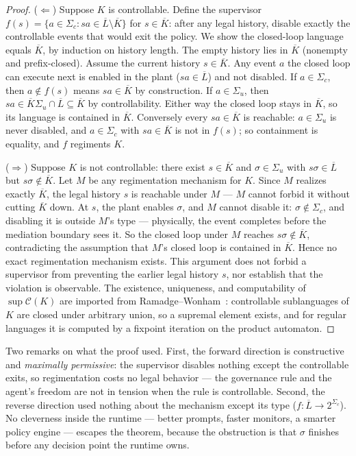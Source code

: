 \documentclass[11pt,a4paper]{article}  \usepackage{mdframed} \usepackage{graphicx} \usepackage{tabularx}
\begin{document}
\begin{proof} ($\Leftarrow$) Suppose $K$ is controllable. Define the supervisor $f(s)=\{a\in\Sigma_c :
sa\in\overline{L}\setminus\overline{K}\}$ for $s\in\overline{K}$: after any legal history, disable exactly the controllable
events that would exit the policy. We show the closed-loop language equals $\overline{K}$, by induction on history length.
The empty history lies in $\overline{K}$ (nonempty and prefix-closed). Assume the current history $s\in\overline{K}$. Any
event $a$ the closed loop can execute next is enabled in the plant ($sa\in\overline{L}$) and not disabled. If $a\in\Sigma_c$,
then $a\notin f(s)$ means $sa\in\overline{K}$ by construction. If $a\in\Sigma_u$, then
$sa\in\overline{K}\Sigma_u\cap\overline{L}\subseteq\overline{K}$ by controllability. Either way the closed loop stays in
$\overline{K}$, so its language is contained in $\overline{K}$. Conversely every $sa\in\overline{K}$ is reachable:
$a\in\Sigma_u$ is never disabled, and $a\in\Sigma_c$ with $sa\in\overline{K}$ is not in $f(s)$; so containment is equality,
and $f$ regiments $K$.

($\Rightarrow$) Suppose $K$ is not controllable: there exist $s\in\overline{K}$ and $\sigma\in\Sigma_u$ with
$s\sigma\in\overline{L}$ but $s\sigma\notin\overline{K}$. Let $M$ be any regimentation mechanism for $K$. Since $M$ realizes
exactly $\overline{K}$, the legal history $s$ is reachable under $M$ --- $M$ cannot forbid it without cutting $\overline{K}$
down. At $s$, the plant enables $\sigma$, and $M$ cannot disable it: $\sigma\notin\Sigma_c$, and disabling it is outside
$M$'s type --- physically, the event completes before the mediation boundary sees it. So the closed loop under $M$ reaches
$s\sigma\notin\overline{K}$, contradicting the assumption that $M$'s closed loop is contained in $\overline{K}$. Hence no
exact regimentation mechanism exists. This argument does not forbid a
supervisor from preventing the earlier legal history $s$, nor establish that
the violation is observable. The existence, uniqueness, and computability of
$\sup\mathcal{C}(K)$ are imported from Ramadge--Wonham~\cite{rw87}: controllable sublanguages of $K$ are closed under
arbitrary union, so a supremal element exists, and for regular languages it is computed by a fixpoint iteration on the
product automaton. \end{proof}

Two remarks on what the proof used. First, the forward direction is constructive and \emph{maximally permissive}: the
supervisor disables nothing except the controllable exits, so regimentation costs no legal behavior --- the governance rule
and the agent's freedom are not in tension when the rule is controllable. Second, the reverse direction used nothing about
the mechanism except its type ($f:\overline{L}\to2^{\Sigma_c}$). No cleverness inside the runtime --- better prompts, faster
monitors, a smarter policy engine --- escapes the theorem, because the obstruction is that $\sigma$ finishes before any
decision point the runtime owns.
\end{document}
